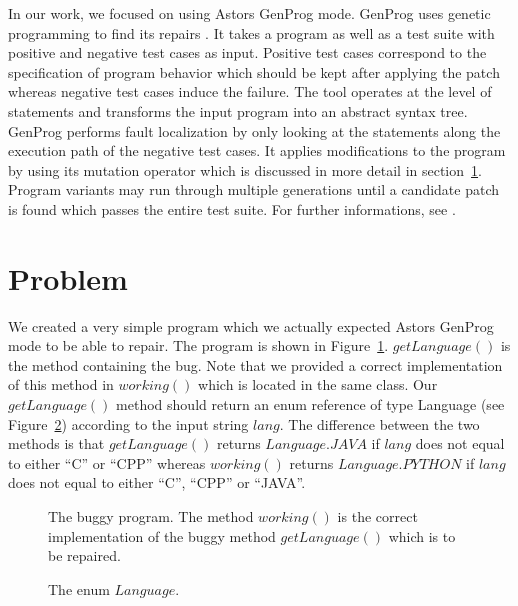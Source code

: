\documentclass[pdftex,english,oribibl]{llncs}
\begin{document}
In our work, we focused on using Astors GenProg mode.
GenProg uses genetic programming to find its repairs \cite{Philipp}.
It takes a program as well as a test suite with positive and negative test cases as input.
Positive test cases correspond to the specification of program behavior which should be kept after applying the patch whereas negative test cases induce the failure.
The tool operates at the level of statements and transforms the input program into an abstract syntax tree.
GenProg performs fault localization by only looking at the statements along the execution path of the negative test cases.
It applies modifications to the program by using its mutation operator which is discussed in more detail in section~\ref{sec:problem}.
Program variants may run through multiple generations until a candidate patch is found which passes the entire test suite. For further informations, see \cite{GenProgPaper}.

\section{Problem}\label{sec:problem}

We created a very simple program which we actually expected Astors GenProg mode to be able to repair.
The program is shown in Figure~\ref{fig:testProgram}.
$getLanguage()$ is the method containing the bug.
Note that we provided a correct implementation of this method in $working()$ which is located in the same class.
Our $getLanguage()$ method should return an enum reference of type Language (see Figure~\ref{fig:enum}) according to the input string $lang$.
The difference between the two methods is that $getLanguage()$ returns $Language.JAVA$ if $lang$ does not equal to either ``C'' or ``CPP'' whereas $working()$ returns $Language.PYTHON$ if $lang$ does not equal to either ``C'', ``CPP'' or ``JAVA''.

\begin{figure}
	\begin{center}
		
	\end{center}
	\caption{The buggy program. The method $working()$ is the correct implementation of the buggy method $getLanguage()$ which is to be repaired.}
	\label{fig:testProgram}
\end{figure}

\begin{figure}
	\begin{center}
		
	\end{center}
	\caption{The enum $Language$.}
	\label{fig:enum}
\end{figure}
\end{document}
